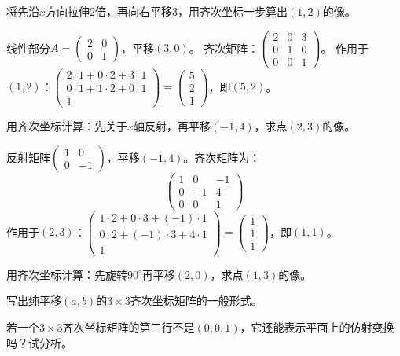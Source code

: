 \begin{example}
将先沿$x$方向拉伸$2$倍，再向右平移$3$，用齐次坐标一步算出$(1,2)$的像。
\end{example}
\begin{solution}
线性部分$A=\begin{pmatrix}2&0\\0&1\end{pmatrix}$，平移$(3,0)$。
齐次矩阵：$\begin{pmatrix}2&0&3\\0&1&0\\0&0&1\end{pmatrix}$。
作用于$(1,2)$：$\begin{pmatrix}2\cdot1+0\cdot2+3\cdot1\\0\cdot1+1\cdot2+0\cdot1\\1\end{pmatrix}=\begin{pmatrix}5\\2\\1\end{pmatrix}$，即$(5,2)$。
\end{solution}

\begin{example}
用齐次坐标计算：先关于$x$轴反射，再平移$(-1,4)$，求点$(2,3)$的像。
\end{example}
\begin{solution}
反射矩阵$\begin{pmatrix}1&0\\0&-1\end{pmatrix}$，平移$(-1,4)$。齐次矩阵为：
\[
\begin{pmatrix}1&0&-1\\0&-1&4\\0&0&1\end{pmatrix}
\]
作用于$(2,3)$：$\begin{pmatrix}1\cdot2+0\cdot3+(-1)\cdot1\\0\cdot2+(-1)\cdot3+4\cdot1\\1\end{pmatrix}=\begin{pmatrix}1\\1\\1\end{pmatrix}$，即$(1,1)$。
\end{solution}

\begin{exercise}
\item 用齐次坐标计算：先旋转$90^\circ$再平移$(2,0)$，求点$(1,3)$的像。
\item 写出纯平移$(a,b)$的$3\times3$齐次坐标矩阵的一般形式。
\item 若一个$3\times3$齐次坐标矩阵的第三行不是$(0,0,1)$，它还能表示平面上的仿射变换吗？试分析。
\end{exercise}

